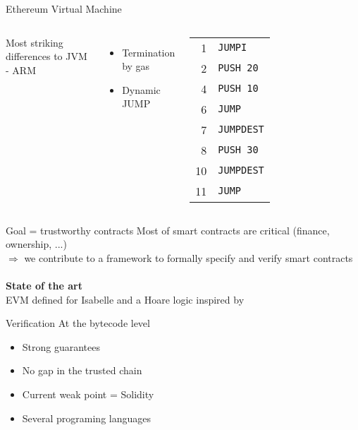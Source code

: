 \documentclass{beamer}
\begin{document}
\begin{frame}{Ethereum Virtual Machine \footnotesize{\cite{wood2014ethereum}}}
	\begin{columns}[c]
		Most striking differences to JVM - ARM
		\begin{itemize}
			\item Termination by gas
			\item Dynamic JUMP
		\end{itemize}
		\begin{tabular}{r l}
			1 & \texttt{JUMPI} \\
			2 & \texttt{PUSH~20}\\
			4 & \texttt{PUSH~10}\\
			6 & \texttt{JUMP}\\
			7 & \texttt{JUMPDEST}\\
			8 & \texttt{PUSH~30}\\
			10 & \texttt{JUMPDEST}\\
			11 & \texttt{JUMP}
		\end{tabular}
	\end{columns}
\end{frame}

\begin{frame}{Goal = trustworthy contracts}
	Most of smart contracts are critical (finance, ownership, ...)\\
	$\Rightarrow$ we contribute to a framework to formally specify and verify smart contracts
	\\ ~ \\
	\textbf{State of the art} \\
	EVM defined for Isabelle \cite{hirai2017defining} and a Hoare logic inspired by \cite{Myreen09}
\end{frame}

\begin{frame}{Verification}
	At the bytecode level
	\begin{itemize}
		\item Strong guarantees
		\item No gap in the trusted chain
		\item Current weak point = Solidity
		\item Several programing languages
	\end{itemize}
\end{frame}
\end{document}
